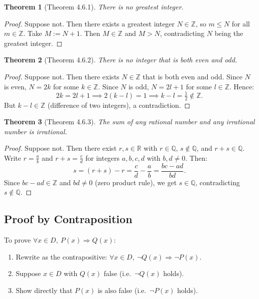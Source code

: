 \documentclass[11pt, a4paper, notitlepage]{report}
\newtheorem{theorem}{Theorem}[section]
\theoremstyle{definition}
\theoremstyle{remark}
\begin{document}
\begin{theorem}[Theorem 4.6.1]
\label{thm:no-greatest-int}
There is no greatest integer.
\end{theorem}

\begin{proof}
Suppose not. Then there exists a greatest integer $N \in \mathbb{Z}$, so $m \le N$ for all
$m \in \mathbb{Z}$. Take $M := N + 1$. Then $M \in \mathbb{Z}$ and $M > N$, contradicting
$N$ being the greatest integer.
\end{proof}

\begin{theorem}[Theorem 4.6.2]
\label{thm:not-even-odd}
There is no integer that is both even and odd.
\end{theorem}

\begin{proof}
Suppose not. Then there exists $N \in \mathbb{Z}$ that is both even and odd. Since $N$ is
even, $N = 2k$ for some $k \in \mathbb{Z}$. Since $N$ is odd, $N = 2l + 1$ for some
$l \in \mathbb{Z}$. Hence:
\[
  2k = 2l + 1 \implies 2(k - l) = 1 \implies k - l = \tfrac{1}{2} \notin \mathbb{Z}.
\]
But $k - l \in \mathbb{Z}$ (difference of two integers), a contradiction.
\end{proof}

\begin{theorem}[Theorem 4.6.3]
\label{thm:rat-irrat-irrat}
The sum of any rational number and any irrational number is irrational.
\end{theorem}

\begin{proof}
Suppose not. Then there exist $r, s \in \mathbb{R}$ with $r \in \mathbb{Q}$,
$s \notin \mathbb{Q}$, and $r + s \in \mathbb{Q}$. Write $r = \tfrac{a}{b}$ and
$r + s = \tfrac{c}{d}$ for integers $a, b, c, d$ with $b, d \ne 0$. Then:
\[
  s = (r + s) - r = \frac{c}{d} - \frac{a}{b} = \frac{bc - ad}{bd}.
\]
Since $bc - ad \in \mathbb{Z}$ and $bd \ne 0$ (zero product rule), we get $s \in \mathbb{Q}$,
contradicting $s \notin \mathbb{Q}$.
\end{proof}

\subsection{Proof by Contraposition}

\begin{keyresult}[title={Method: Proof by Contraposition}]
To prove $\forall x \in D,\ P(x) \Rightarrow Q(x)$:
\begin{enumerate}[nosep]
  \item Rewrite as the contrapositive: $\forall x \in D,\ \lnot Q(x) \Rightarrow \lnot P(x)$.
  \item Suppose $x \in D$ with $Q(x)$ false (i.e.\ $\lnot Q(x)$ holds).
  \item Show directly that $P(x)$ is also false (i.e.\ $\lnot P(x)$ holds).
\end{enumerate}
\end{keyresult}
\end{document}
